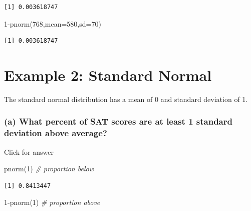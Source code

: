 \documentclass[
]{book}
\newenvironment{Shaded}{\begin{snugshade}}{\end{snugshade}}
\newcommand{\AttributeTok}[1]{\textcolor[rgb]{0.77,0.63,0.00}{#1}}
\newcommand{\CommentTok}[1]{\textcolor[rgb]{0.56,0.35,0.01}{\textit{#1}}}
\newcommand{\DecValTok}[1]{\textcolor[rgb]{0.00,0.00,0.81}{#1}}
\newcommand{\FunctionTok}[1]{\textcolor[rgb]{0.00,0.00,0.00}{#1}}
\newcommand{\NormalTok}[1]{#1}
\newcommand{\SpecialCharTok}[1]{\textcolor[rgb]{0.00,0.00,0.00}{#1}}
\begin{document}
\begin{verbatim}
[1] 0.003618747
\end{verbatim}

\begin{Shaded}
\begin{Highlighting}[]
\DecValTok{1}\SpecialCharTok{{-}}\FunctionTok{pnorm}\NormalTok{(}\DecValTok{768}\NormalTok{,}\AttributeTok{mean=}\DecValTok{580}\NormalTok{,}\AttributeTok{sd=}\DecValTok{70}\NormalTok{)}
\end{Highlighting}
\end{Shaded}

\begin{verbatim}
[1] 0.003618747
\end{verbatim}

\hypertarget{example-2-standard-normal}{%
\section{Example 2: Standard Normal}\label{example-2-standard-normal}}

The standard normal distribution has a mean of 0 and standard deviation of 1.

\hypertarget{a-what-percent-of-sat-scores-are-at-least-1-standard-deviation-above-average}{%
\subsubsection{(a) What percent of SAT scores are at least 1 standard deviation above average?}\label{a-what-percent-of-sat-scores-are-at-least-1-standard-deviation-above-average}}

\hfill\break

Click for answer

\begin{Shaded}
\begin{Highlighting}[]
\FunctionTok{pnorm}\NormalTok{(}\DecValTok{1}\NormalTok{)  }\CommentTok{\# proportion below}
\end{Highlighting}
\end{Shaded}

\begin{verbatim}
[1] 0.8413447
\end{verbatim}

\begin{Shaded}
\begin{Highlighting}[]
\DecValTok{1}\SpecialCharTok{{-}}\FunctionTok{pnorm}\NormalTok{(}\DecValTok{1}\NormalTok{) }\CommentTok{\# proportion above}
\end{Highlighting}
\end{Shaded}
\end{document}
